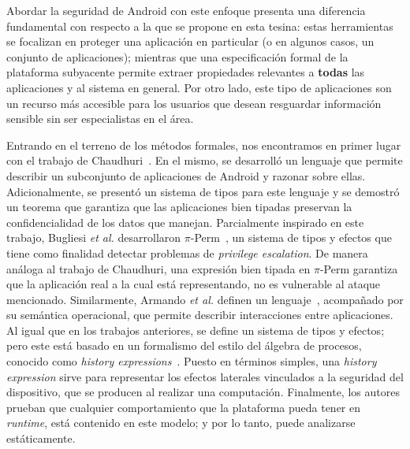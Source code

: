 Abordar la seguridad de Android con este enfoque presenta una diferencia
fundamental con respecto a la que se propone en esta tesina: estas herramientas
se focalizan en proteger una aplicación en particular (o en algunos casos, un
conjunto de aplicaciones); mientras que una especificación formal de la
plataforma subyacente permite extraer propiedades relevantes a \textbf{todas}
las aplicaciones y al sistema en general. Por otro lado, este tipo de
aplicaciones son un recurso más accesible para los usuarios que desean
resguardar información sensible sin ser especialistas en el área.





Entrando en el terreno de los métodos formales, nos encontramos en primer lugar
con el trabajo de Chaudhuri~\cite{chaudhuri}. En el mismo, se desarrolló un
lenguaje que permite describir un subconjunto de aplicaciones de Android y
razonar sobre ellas. Adicionalmente, se presentó un sistema de tipos para este
lenguaje y se demostró un teorema que garantiza que las aplicaciones bien
tipadas preservan la confidencialidad de los datos que manejan. Parcialmente
inspirado en este trabajo, Bugliesi \textit{et al.} desarrollaron
$\pi$-Perm~\cite{bugliesi}, un sistema de tipos y efectos que tiene como
finalidad detectar problemas de \textit{privilege escalation}. De manera análoga
al trabajo de Chaudhuri, una expresión bien tipada en $\pi$-Perm garantiza que
la aplicación real a la cual está representando, no es vulnerable al ataque
mencionado. Similarmente, Armando \textit{et al.} definen un
lenguaje~\cite{armando}, acompañado por su semántica operacional, que permite
describir interacciones entre aplicaciones. Al igual que en los trabajos
anteriores, se define un sistema de tipos y efectos; pero este está basado en un
formalismo del estilo del álgebra de procesos, conocido como \textit{history
    expressions}~\cite{history-expressions}. Puesto en términos simples, una
\textit{history expression} sirve para representar los efectos laterales
vinculados a la seguridad del dispositivo, que se producen al realizar una
computación. Finalmente, los autores prueban que cualquier comportamiento que la
plataforma pueda tener en \textit{runtime}, está contenido en este modelo; y por
lo tanto, puede analizarse estáticamente.

